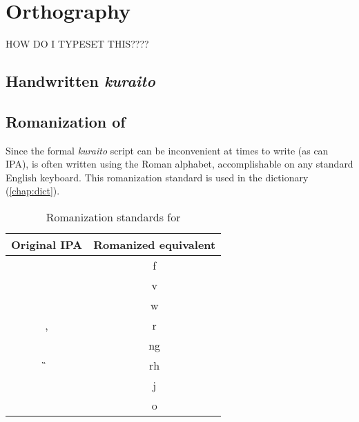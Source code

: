 \chapter{Orthography}
\label{chap:ortho}

HOW DO I TYPESET THIS????

\section{Handwritten \emph{kuraito}}

\section{Romanization of \kurango}
	Since the formal \emph{kuraito} script can be inconvenient at times to write (as can IPA), {\kurango} is often written using the Roman alphabet, accomplishable on any standard English keyboard. This romanization standard is used in the dictionary (\autoref{chap:dict}).

	\begin{table}[H]
	\centering
	\label{roman}
		\begin{tabular}{cc}
		Original IPA & Romanized equivalent \\ \hline\hline
		\F & f \\
		\B & v \\
		\W & w \\
		\R, \textipa{\*r} & r \\
		\N & ng \\
		\G & rh \\
		\M & j \\ 
		\OO & o \\ \hline
		\end{tabular}
	\caption{Romanization standards for \kurango}
	\end{table}
